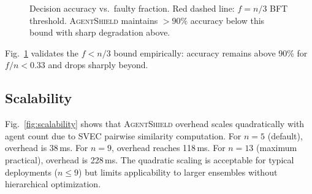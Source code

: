 \documentclass[journal,10pt]{IEEEtran}
\begin{document}
\begin{figure}[t]
\centering
{}
\caption{Decision accuracy vs.\ faulty fraction. Red dashed line: $f = n/3$ BFT threshold. \textsc{AgentShield} maintains $>90\%$ accuracy below this bound with sharp degradation above.}
\label{fig:bft_val}
\end{figure}

Fig.~\ref{fig:bft_val} validates the $f < n/3$ bound empirically: accuracy remains above 90\% for $f/n < 0.33$ and drops sharply beyond.

\subsection{Scalability}
Fig.~\ref{fig:scalability} shows that \textsc{AgentShield} overhead scales quadratically with agent count due to SVEC pairwise similarity computation. For $n=5$ (default), overhead is 38\,ms. For $n=9$, overhead reaches 118\,ms. For $n=13$ (maximum practical), overhead is 228\,ms. The quadratic scaling is acceptable for typical deployments ($n \leq 9$) but limits applicability to larger ensembles without hierarchical optimization.
\end{document}
